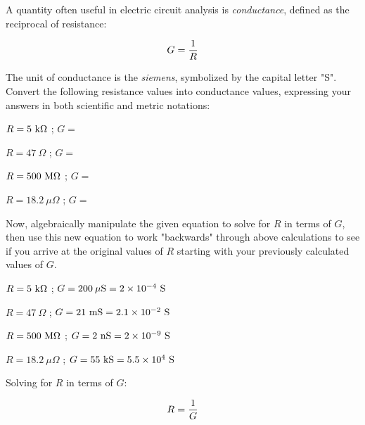 

A quantity often useful in electric circuit analysis is {\it conductance}, defined as the reciprocal of resistance:

$$G = {1 \over R}$$

The unit of conductance is the {\it siemens}, symbolized by the capital letter "S".  Convert the following resistance values into conductance values, expressing your answers in both scientific and metric notations:

\vskip 10pt

$R = 5 \hbox{ k} \Omega$ ; $G = $

\vskip 10pt

$R = 47 \> \Omega$ ; $G = $

\vskip 10pt

$R = 500 \hbox{ M} \Omega$ ; $G = $

\vskip 10pt

$R = 18.2 \> \mu \Omega$ ; $G = $

\vskip 10pt

Now, algebraically manipulate the given equation to solve for $R$ in terms of $G$, then use this new equation to work "backwards" through above calculations to see if you arrive at the original values of $R$ starting with your previously calculated values of $G$.







$R = 5 \hbox{ k} \Omega$ ; $G = 200 \> \mu \hbox{S} = 2 \times 10^{-4} \hbox{ S}$

\vskip 10pt

$R = 47 \> \Omega$ ; $G = 21 \hbox{ mS} = 2.1 \times 10^{-2} \hbox{ S}$

\vskip 10pt

$R = 500 \hbox{ M} \Omega$ ; $G = 2 \hbox{ nS} = 2 \times 10^{-9} \hbox{ S}$

\vskip 10pt

$R = 18.2 \> \mu \Omega$ ; $G = 55 \hbox{ kS} = 5.5 \times 10^{4} \hbox{ S}$

\vskip 20pt

Solving for $R$ in terms of $G$:

$$R = {1 \over G}$$

